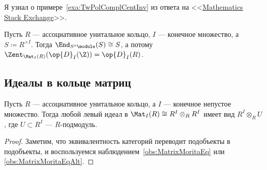 \documentclass[
	extrafontsizes,
	11pt,
	hyphens,
]{memoir}
\begin{document}
\begin{remark}
Я узнал о примере~\ref{exa:TwPolComplCentInv} из ответа \cite{ms342817} на
<<\href{https://math.stackexchange.com}{\textenglish{Mathematics Stack Exchange}}>>.
\end{remark}

%
%
%

\begin{observation}
Пусть \(R\) --- ассоциативное унитальное кольцо, \(I\) --- конечное множество, а \(S \coloneqq R^{\times I}\).
Тогда \(\End_{S^o\module}(S) \cong S\), а потому \(\Zent_{\Mat_I(R)}(\op{D}_I(\Z)) = \op{D}_I(R)\).
\end{observation}

\subsection{Идеалы в кольце матриц}

\begin{corollary}
\label{cor:Matrix_Left_Ideals}
Пусть \(R\) --- ассоциативное унитальное кольцо, а \(I\) --- конечное непустое множество.
Тогда любой левый идеал в \(\Mat_I(R) \cong R^I \otimes_R R^I\) имеет вид \(R^I \otimes_R U\), где \(U \subset R^I\) --- \(R\)-под\-мо\-дуль.
\end{corollary}

\begin{proof}
Заметим, что эквивалентность категорий переводит подобъекты в подобъекты, и воспользуемся наблюдением~\ref{obs:MatrixMoritaEq} или \ref{obs:MatrixMoritaEqAlt}.
\end{proof}
\end{document}
